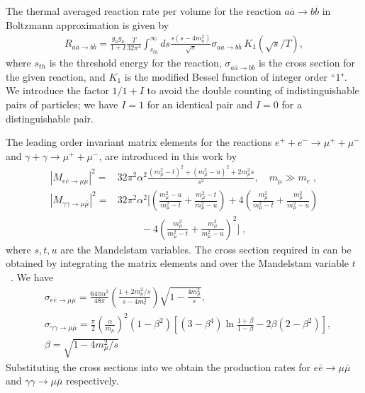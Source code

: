 The thermal averaged reaction rate per volume for the reaction $a\overline{a}\rightarrow b\overline{b}$ in Boltzmann approximation is given by~\cite{Letessier:2002ony}
\begin{align}\label{pairR}
R_{a\overline{a}\rightarrow b\overline{b}}=\frac{g_ag_{\overline{a}}}{1+I}\frac{T}{32\pi^4}\int_{s_{th}}^\infty ds\frac{s(s-4m^2_a)}{\sqrt{s}}\sigma_{a\overline{a}\rightarrow b\overline{b}}~K_1(\sqrt{s}/T),
\end{align}
where $s_{th}$ is the threshold energy for the reaction, $\sigma_{a\overline{a}\rightarrow b\overline{b}}$ is the cross section for the given reaction, and $K_1$ is the modified
Bessel function of integer order ``$1$". We introduce the factor $1/1+I$ to avoid the double counting of indistinguishable pairs of particles; we have $I=1$ for an identical pair and $I=0$ for a distinguishable pair.

The leading order invariant matrix elements for the reactions $e^++e^-\to\mu^++\mu^-$ and $\gamma+\gamma\to\mu^++\mu^-$, are introduced in this work by~\cite{Kuznetsova:2008jt}
\begin{align}\label{Mee}
|M_{e\bar e\to\mu\bar\mu}|^2=&32\pi^2\alpha^2\frac{(m_\mu^2-t)^2+(m_\mu^2-u)^2+2m_\mu^2s}{s^2},\quad m_\mu\gg m_e\;,\\[0.2cm]
\label{Mgg}
|M_{\gamma\gamma\to\mu\bar\mu}|^2=&32\pi^2\alpha^2\bigg[\left(\frac{m_\mu^2-u}{m_\mu^2-t}+\frac{m_\mu^2-t}{m_\mu^2-u}\right)+4\left(\frac{m_\mu^2}{m_\mu^2-t}+\frac{m_\mu^2}{m^2_\mu-u}\right)\\[0.1cm]  \nonumber
&\hspace{1cm}-4\left(\frac{m_\mu^2}{m^2_\mu-t}+\frac{m^2_\mu}{m^2_\mu-u}\right)^2\bigg]\;,
\end{align}
 where $s, t, u$ are the Mandelstam variables. The cross section required in  can be obtained by integrating the matrix elements  and  over the Mandelstam variable $t$~\cite{Kuznetsova:2010pi}. We have
\begin{align}
&\sigma_{e\bar e\to\mu\bar\mu} 
=\frac{64\pi\alpha^2}{48\pi}\left(\frac{1+2m^2_\mu/s}{s-4m_e^2}\right)\sqrt{1-\frac{4m^2_\mu}{s}},\\
&\sigma_{\gamma\gamma\to\mu\bar\mu}=\frac{\pi}{2}\left(\frac{\alpha}{m_\mu}\right)^2(1-\beta^2)\left[(3-\beta^4)\ln\frac{1+\beta}{1-\beta}-2\beta(2-\beta^2)\right],\\
&\beta=\sqrt{1-4m^2_\mu/s}
\end{align}
Substituting the cross sections into  we obtain the production rates for $e\bar e\to\mu\bar\mu$ and $\gamma\gamma\to\mu\bar\mu$ respectively.

